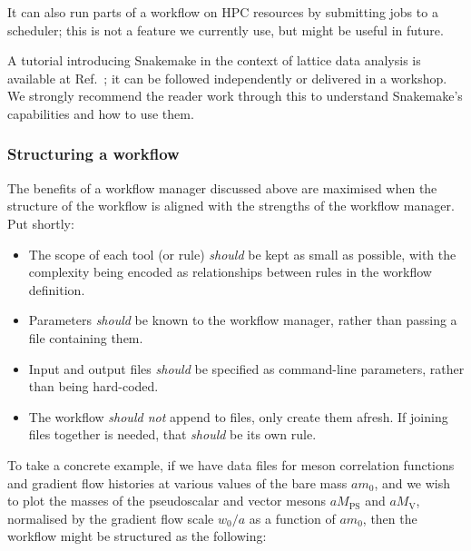 \documentclass{article}
\newcommand\rfcword[1]{\emph{#1}\xspace}
\newcommand\should{\rfcword{should}}
\newcommand\shouldnot{\rfcword{should not}}
\begin{document}
It can also run parts of a workflow on HPC resources
by submitting jobs to a scheduler;
this is not a feature we currently use,
but might be useful in future.

A tutorial introducing Snakemake in the context of lattice data analysis
is available at Ref.~\cite{snakemake-lattice,bennett_2026_22147188};
it can be followed independently or delivered in a workshop.
We strongly recommend the reader work through this
to understand Snakemake's capabilities and how to use them.

\subsubsection{Structuring a workflow}

The benefits of a workflow manager discussed above are maximised when
the structure of the workflow is aligned with the strengths of the workflow manager.
Put shortly:
\begin{itemize}
  \item
        The scope of each tool
        (or rule)
        \should be kept as small as possible,
        with the complexity being encoded as relationships between rules in the workflow definition.
  \item
        Parameters \should be known to the workflow manager,
        rather than passing a file containing them.
  \item
        Input and output files \should be specified as command-line parameters,
        rather than being hard-coded.
  \item
        The workflow \shouldnot append to files,
        only create them afresh.
        If joining files together is needed,
        that \should be its own rule.
\end{itemize}

To take a concrete example,
if we have data files for meson correlation functions and gradient flow histories
at various values of the bare mass $am_{0}$,
and we wish to plot the masses of the pseudoscalar and vector mesons
$aM_{\mathrm{PS}}$ and $aM_{\mathrm{V}}$,
normalised by the gradient flow scale $w_{0}/a$
as a function of $am_{0}$,
then the workflow might be structured as the following:
\end{document}

